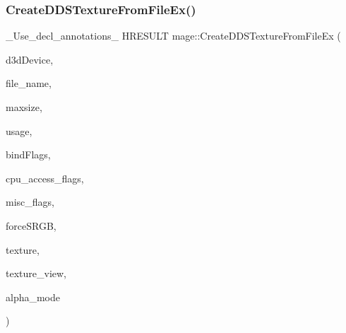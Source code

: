 \subsubsection{\texorpdfstring{Create\+D\+D\+S\+Texture\+From\+File\+Ex()}{CreateDDSTextureFromFileEx()}\hspace{0.1cm}{\footnotesize\ttfamily [3/4]}}
{\footnotesize\ttfamily \+\_\+\+Use\+\_\+decl\+\_\+annotations\+\_\+ H\+R\+E\+S\+U\+LT mage\+::\+Create\+D\+D\+S\+Texture\+From\+File\+Ex (\begin{DoxyParamCaption}\item[{I\+D3\+D11\+Device $\ast$}]{d3d\+Device,  }\item[{const wchar\+\_\+t $\ast$}]{file\+\_\+name,  }\item[{size\+\_\+t}]{maxsize,  }\item[{D3\+D11\+\_\+\+U\+S\+A\+GE}]{usage,  }\item[{uint32\+\_\+t}]{bind\+Flags,  }\item[{uint32\+\_\+t}]{cpu\+\_\+access\+\_\+flags,  }\item[{uint32\+\_\+t}]{misc\+\_\+flags,  }\item[{bool}]{force\+S\+R\+GB,  }\item[{I\+D3\+D11\+Resource $\ast$$\ast$}]{texture,  }\item[{I\+D3\+D11\+Shader\+Resource\+View $\ast$$\ast$}]{texture\+\_\+view,  }\item[{\hyperlink{namespacemage_a0c586a2bad862f4858900ca121ca80c2}{D\+D\+S\+\_\+\+A\+L\+P\+H\+A\+\_\+\+M\+O\+DE} $\ast$}]{alpha\+\_\+mode }\end{DoxyParamCaption})}

\hypertarget{namespacemage_a8d07edf15d12fdc0f0af833ea4845161}{}\label{namespacemage_a8d07edf15d12fdc0f0af833ea4845161} 
